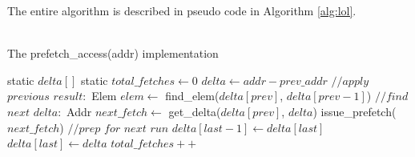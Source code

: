 The entire algorithm is described in pseudo code in Algorithm \ref{alg:lol}. \\\\
\begin{algorithm}
\caption{The prefetch\_access(addr) implementation}
\label{alg:lol}
\begin{algorithmic}
\STATE static $delta[]$
\STATE static $total\_fetches \gets 0$
\STATE $delta \gets addr - prev\_addr$
\STATE
\STATE $//apply$ $previous$ $result:$
\STATE Elem $elem \gets$ find\_elem($delta[prev]$, $delta[prev - 1]$)
\ENDIF
{}
\ELSE
{}
\ENDIF
\ELSE
{}
\ELSE
{}
\ENDIF
\ENDIF
\STATE
\STATE $//find$ $next$ $delta:$
\STATE Addr $next\_fetch \gets$ get\_delta($delta[prev]$, $delta$)
\STATE issue\_prefetch($next\_fetch$)
\STATE
\STATE $//prep$ $for$ $next$ $run$
\STATE $delta[last - 1] \gets delta[last]$
\STATE $delta[last] \gets delta$
\STATE $total\_fetches++$
\end{algorithmic}
\end{algorithm}


